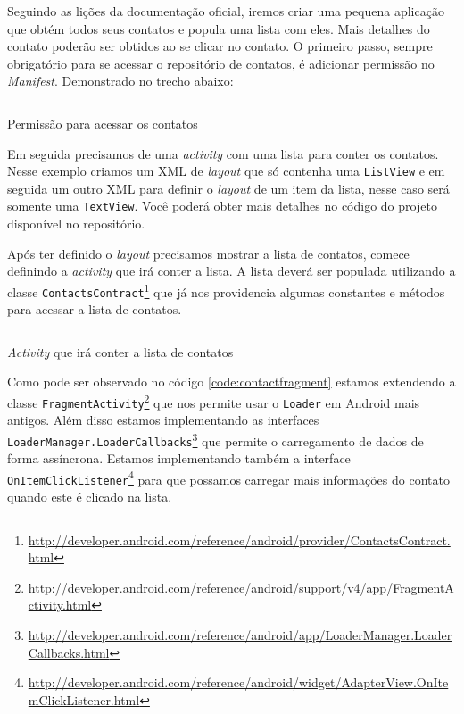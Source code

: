\documentclass[a4paper,12pt,brazil]{book}
\begin{document}
\begin{singlespace}
	Seguindo as lições da documentação oficial, iremos criar uma pequena aplicação que obtém todos seus contatos e popula uma lista com eles. Mais detalhes do contato poderão ser obtidos ao se clicar no contato. O primeiro passo, sempre obrigatório para se acessar o repositório de contatos, é adicionar permissão no \emph{Manifest}. Demonstrado no trecho abaixo:	

		\begin{listing}[H]
		\inputminted[linenos=true,fontsize=\small,frame=lines, framesep=2mm, tabsize=2,numbersep=5pt]{xml}{src/api/contacts/permission.xml}
		\caption{Permissão para acessar os contatos}
		\label{code:contactpermission}
		\end{listing} 	
	
	Em seguida precisamos de uma \emph{activity} com uma lista para conter os contatos. Nesse exemplo criamos um XML de \emph{layout} que só contenha uma \texttt{ListView} e em seguida um outro XML para definir o \emph{layout} de um item da lista, nesse caso será somente uma \texttt{TextView}. Você poderá obter mais detalhes no código do projeto disponível no repositório.


	Após ter definido o \emph{layout} precisamos mostrar a lista de contatos, comece definindo a \emph{activity} que irá conter a lista. A lista deverá ser populada utilizando a classe \texttt{ContactsContract}\footnote{\href{http://developer.android.com/reference/android/provider/ContactsContract.html}{http://developer.android.com/reference/android/provider/ContactsContract.html}} que já nos providencia algumas constantes e métodos para acessar a lista de contatos.

		\begin{listing}[H]
		\inputminted[linenos=true,fontsize=\small,frame=lines, framesep=2mm, tabsize=2,numbersep=5pt]{java}{src/api/contacts/fragment.java}
		\caption{\emph{Activity} que irá conter a lista de contatos}
		\label{code:contactfragment}
		\end{listing} 	
	
	Como pode ser observado no código \ref{code:contactfragment} estamos extendendo a classe \texttt{FragmentActivity}\footnote{\href{http://developer.android.com/reference/android/support/v4/app/FragmentActivity.html}{http://developer.android.com/reference/android/support/v4/app/FragmentActivity.html}} que nos permite usar o \texttt{Loader} em Android mais antigos. Além disso estamos implementando as interfaces \texttt{LoaderManager.LoaderCallbacks}\footnote{\href{http://developer.android.com/reference/android/app/LoaderManager.LoaderCallbacks.html}{http://developer.android.com/reference/android/app/LoaderManager.LoaderCallbacks.html}} que permite o carregamento de dados de forma assíncrona. Estamos implementando também a interface \texttt{OnItemClickListener}\footnote{\href{http://developer.android.com/reference/android/widget/AdapterView.OnItemClickListener.html}{http://developer.android.com/reference/android/widget/AdapterView.OnItemClickListener.html}} para que possamos carregar mais informações do contato quando este é clicado na lista.
	

\end{singlespace}
\end{document}
